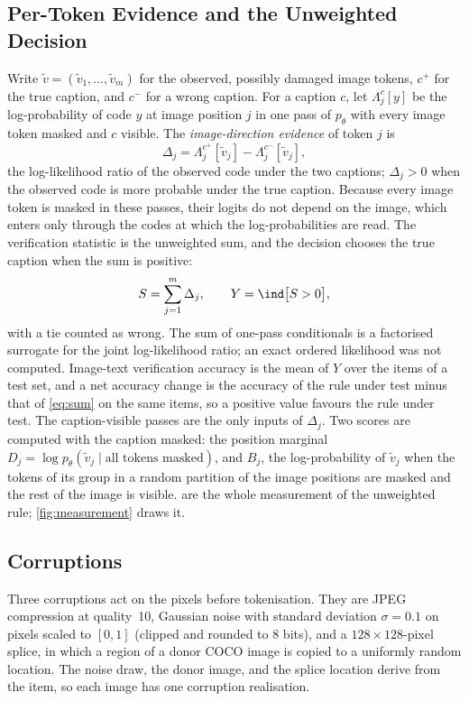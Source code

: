 \subsection{Per-Token Evidence and the Unweighted Decision}\label{sec:setting-evidence}
Write $\tilde v=(\tilde v_1,\dots,\tilde v_m)$ for the observed, possibly damaged image tokens, $c^+$ for the true caption, and $c^-$ for a
wrong caption.
For a caption $c$, let $\Lambda^{c}_j[y]$ be the log-probability of code $y$ at image position $j$ in one pass of $p_\theta$ with every
image token masked and $c$ visible.
The \emph{image-direction evidence} of token $j$ is
\begin{equation}
\Delta_j=\Lambda^{c^+}_j[\tilde v_j]-\Lambda^{c^-}_j[\tilde v_j],
\label{eq:delta}
\end{equation}
the log-likelihood ratio of the observed code under the two captions; $\Delta_j>0$ when the observed code is more probable under the true caption.
Because every image token is masked in these passes, their logits do not depend on the image, which enters only through the codes at
which the log-probabilities are read.
The verification statistic is the unweighted sum, and the decision chooses the true caption when the sum is positive:
\begin{equation}
S=\sum_{j=1}^{m}\Delta_j,\qquad Y=\ind\big[S>0\big],
\label{eq:sum}
\end{equation}
with a tie counted as wrong.
The sum of one-pass conditionals is a factorised surrogate for the joint log-likelihood ratio; an exact ordered likelihood was not computed.
Image-text verification accuracy is the mean of $Y$ over the items of a test set, and a net accuracy change is the accuracy of the rule
under test minus that of \eqref{eq:sum} on the same items, so a positive value favours the rule under test.
The caption-visible passes are the only inputs of $\Delta_j$.
Two scores are computed with the caption masked: the position marginal $D_j=\log p_\theta(\tilde v_j\mid\text{all tokens masked})$,
and $B_j$, the log-probability of $\tilde v_j$ when the tokens of its group in a random partition of the image positions are masked and
the rest of the image is visible.
 are the whole measurement of the unweighted rule; \cref{fig:measurement} draws it.

\subsection{Corruptions}\label{sec:setting-corruptions}
Three corruptions act on the pixels before tokenisation.
They are JPEG compression at quality~10, Gaussian noise with standard deviation $\sigma=0.1$ on pixels scaled to $[0,1]$ (clipped and
rounded to 8 bits), and a $128\times128$-pixel splice, in which a region of a donor COCO image is copied to a uniformly random location.
The noise draw, the donor image, and the splice location derive from the item, so each image has one corruption realisation.
